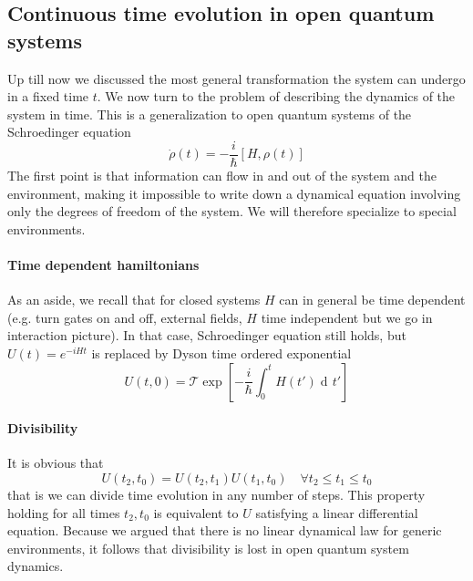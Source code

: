 \documentclass[a4paper, 11pt]{article}
\newcommand{\dd}{\mathop{\mathrm{d}\!}{}}
\begin{document}
	\subsection{Continuous time evolution in open quantum systems}
	Up till now we discussed the most general transformation the system can undergo in a fixed time $t$. We now turn to the problem of describing the dynamics of the system in time. This is a generalization to open quantum systems of the Schroedinger equation
	\[ \dot{\rho}(t) = -\frac{i}{\hbar} [H, \rho(t)] \]
	The first point is that information can flow in and out of the system and the environment, making it impossible to write down a dynamical equation involving only the degrees of freedom of the system. We will therefore specialize to special environments.
	
	\paragraph{Time dependent hamiltonians} As an aside, we recall that for closed systems $H$ can in general be time dependent (e.g. turn gates on and off, external fields, $H$ time independent but we go in interaction picture). In that case, Schroedinger equation still holds, but
	$U(t)=e^{-i H t}$ is replaced by Dyson time ordered exponential
	\[ U(t,0) = \mathcal{T}\exp\left[-\frac{i}{\hbar} \int_{0}^{t} H(t') \dd t' \right] \]
	
	\paragraph{Divisibility} It is obvious that
	\[ U(t_2, t_0) = U(t_2, t_1) U(t_1, t_0)\quad \forall t_2\le t_1 \le t_0 \]
	that is we can divide time evolution in any number of steps. This property holding for all times $t_2, t_0$ is equivalent to $U$ satisfying a linear differential equation. Because we argued that there is no linear dynamical law for generic environments, it follows that divisibility is lost in open quantum system dynamics.
	
\end{document}
